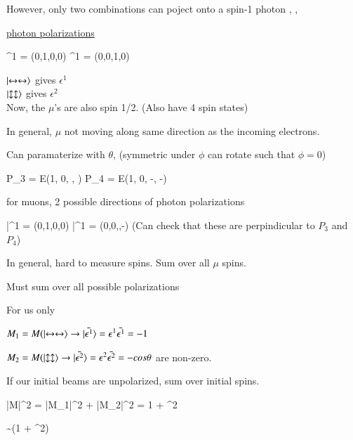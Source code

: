 {However, only two combinations can poject onto a spin-1 photon
\be
\ket{\leftrightarrow \leftrightarrow}, \ket{\updownarrow \updownarrow}, 
\ee


\underline{photon polarizations} 

\be
\epsilon^1 = (0,1,0,0) \hspace*{1in} \epsilon^1 = (0,0,1,0)
\ee


$\ket{\leftrightarrow \leftrightarrow}$ gives $\epsilon^1$\\
$\ket{\updownarrow \updownarrow}$ gives $\epsilon^2$\\

Now, the $\mu$'s are also spin 1/2.  (Also have 4 spin states)

In general, $\mu$ not moving along same direction as the incoming electrons. 

Can paramaterize with $\theta$, (symmetric under $\phi$ can rotate such that $\phi = 0$)

\be
P_3 = E(1, 0, \sin\theta, \cos\theta ) \hspace*{1in}  P_4 = E(1, 0, -\sin\theta, -\cos\theta )
\ee

for muons, 2 possible directions of photon polarizations

\be
\bar{\epsilon}^1 = (0,1,0,0)  \hspace*{1in} \bar{\epsilon}^1 = (0,0,\cos\theta,-\sin\theta)
\ee
(Can check that these are perpindicular to $P_3$ and $P_4$)

In general,  hard to measure spins. Sum over all $\mu$ spins.

Must sum over all possible  polarizations


For us only 
\bi
\item[-]$M_1 = M(\ket{\leftrightarrow \leftrightarrow} \rightarrow \ket{\bar{\epsilon^1}} = \epsilon^1 \bar{\epsilon^1} = -1$ 
\item[-]$M_2 = M(\ket{\updownarrow \updownarrow} \rightarrow \ket{\bar{\epsilon^2}} = \epsilon^2 \bar{\epsilon^2} = -cos\theta$ 
\ei
are non-zero.

If our initial beams are unpolarized, sum over initial spins. 

\be
|M|^2 = |M_1|^2 + |M_2|^2 = 1 + \cos^2\theta
\ee


\be
{} \sim {}(1 + \cos^2\theta)
\ee


}


